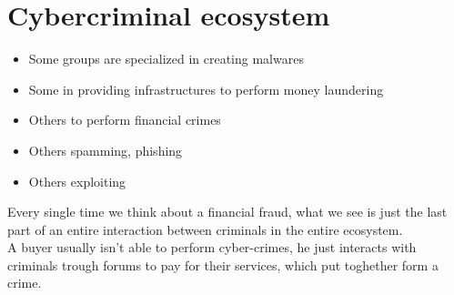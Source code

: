 \section{Cybercriminal ecosystem}
    \begin{figure}[!ht]
    \end{figure}
    \begin{itemize}
        \item Some groups are specialized in creating malwares
        \item Some in providing infrastructures to perform money laundering
        \item Others to perform financial crimes
        \item Others spamming, phishing 
        \item Others exploiting 
    \end{itemize}
    Every single time we think about a financial fraud, what we see is just the last part of an entire interaction between criminals in the entire ecosystem.\\ 
    A buyer usually isn't able to perform cyber-crimes, he just interacts with criminals trough forums to pay for their services, which put toghether form a crime.
